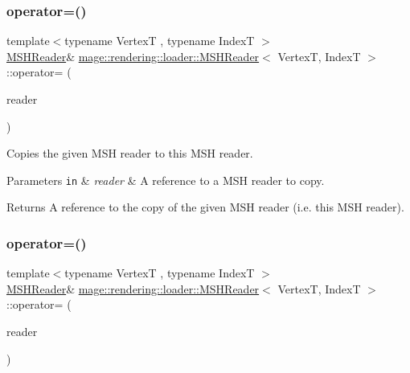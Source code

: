 \subsubsection{\texorpdfstring{operator=()}{operator=()}\hspace{0.1cm}{\footnotesize\ttfamily [1/2]}}
{\footnotesize\ttfamily template$<$typename VertexT , typename IndexT $>$ \\
\hyperlink{classmage_1_1rendering_1_1loader_1_1_m_s_h_reader}{M\+S\+H\+Reader}\& \hyperlink{classmage_1_1rendering_1_1loader_1_1_m_s_h_reader}{mage\+::rendering\+::loader\+::\+M\+S\+H\+Reader}$<$ VertexT, IndexT $>$\+::operator= (\begin{DoxyParamCaption}\item[{const \hyperlink{classmage_1_1rendering_1_1loader_1_1_m_s_h_reader}{M\+S\+H\+Reader}$<$ VertexT, IndexT $>$ \&}]{reader }\end{DoxyParamCaption})\hspace{0.3cm}{\ttfamily [delete]}}

Copies the given M\+SH reader to this M\+SH reader.


\begin{DoxyParams}[1]{Parameters}
\mbox{\tt in}  & {\em reader} & A reference to a M\+SH reader to copy. \\
\hline
\end{DoxyParams}
\begin{DoxyReturn}{Returns}
A reference to the copy of the given M\+SH reader (i.\+e. this M\+SH reader). 
\end{DoxyReturn}
\hypertarget{classmage_1_1rendering_1_1loader_1_1_m_s_h_reader_a8764164f7e0f78938c5e303d13e0f64d}{}\label{classmage_1_1rendering_1_1loader_1_1_m_s_h_reader_a8764164f7e0f78938c5e303d13e0f64d} 
\subsubsection{\texorpdfstring{operator=()}{operator=()}\hspace{0.1cm}{\footnotesize\ttfamily [2/2]}}
{\footnotesize\ttfamily template$<$typename VertexT , typename IndexT $>$ \\
\hyperlink{classmage_1_1rendering_1_1loader_1_1_m_s_h_reader}{M\+S\+H\+Reader}\& \hyperlink{classmage_1_1rendering_1_1loader_1_1_m_s_h_reader}{mage\+::rendering\+::loader\+::\+M\+S\+H\+Reader}$<$ VertexT, IndexT $>$\+::operator= (\begin{DoxyParamCaption}\item[{\hyperlink{classmage_1_1rendering_1_1loader_1_1_m_s_h_reader}{M\+S\+H\+Reader}$<$ VertexT, IndexT $>$ \&\&}]{reader }\end{DoxyParamCaption})\hspace{0.3cm}{\ttfamily [delete]}}

